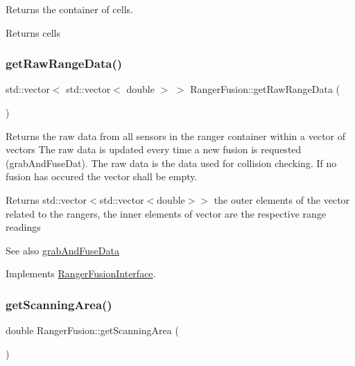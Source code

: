 Returns the container of cells. 

\begin{DoxyReturn}{Returns}
cells 
\end{DoxyReturn}
\mbox{\label{classRangerFusion_a5780383fdffe121a7a2372a047819ba9}} 
\subsubsection{\texorpdfstring{get\+Raw\+Range\+Data()}{getRawRangeData()}}
{\footnotesize\ttfamily std\+::vector$<$ std\+::vector$<$ double $>$ $>$ Ranger\+Fusion\+::get\+Raw\+Range\+Data (\begin{DoxyParamCaption}{ }\end{DoxyParamCaption})\hspace{0.3cm}{\ttfamily [virtual]}}



Returns the raw data from all sensors in the ranger container within a vector of vectors The raw data is updated every time a new fusion is requested (grab\+And\+Fuse\+Dat). The raw data is the data used for collision checking. If no fusion has occured the vector shall be empty. 

\begin{DoxyReturn}{Returns}
std\+::vector$<$std\+::vector$<$double$>$$>$ the outer elements of the vector related to the rangers, the inner elements of vector are the respective range readings 
\end{DoxyReturn}
\begin{DoxySeeAlso}{See also}
\hyperlink{classRangerFusion_aa9265f72bc3572567c9cf98cf6d9f0e1}{grab\+And\+Fuse\+Data} 
\end{DoxySeeAlso}


Implements \hyperlink{classRangerFusionInterface_a9d60ca5866261026b870d7c0171587f5}{Ranger\+Fusion\+Interface}.

\mbox{\label{classRangerFusion_a7215e5405e808b5a853984e2b70ed6ad}} 
\subsubsection{\texorpdfstring{get\+Scanning\+Area()}{getScanningArea()}}
{\footnotesize\ttfamily double Ranger\+Fusion\+::get\+Scanning\+Area (\begin{DoxyParamCaption}{ }\end{DoxyParamCaption})\hspace{0.3cm}{\ttfamily [virtual]}}



